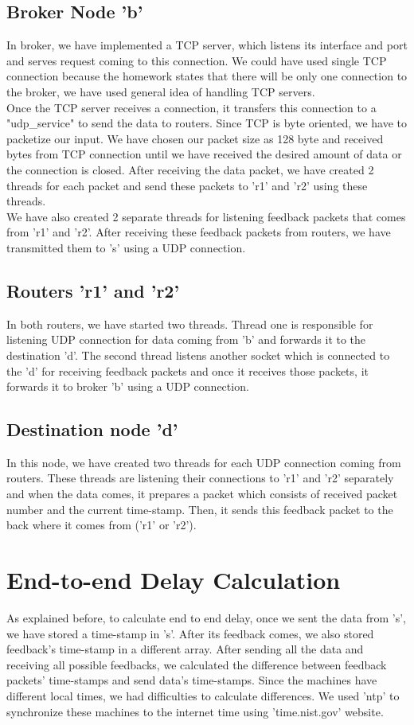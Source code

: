 \documentclass[12pt,journal,compsoc]{IEEEtran}
\begin{document}
\subsection{Broker Node 'b'}
In broker, we have implemented a TCP server, which listens its interface and port and serves request coming to this connection. We  could have used single TCP connection because the homework states that there will be only one connection to the broker, we have used general idea of handling TCP servers.\\
Once the TCP server receives a connection, it transfers this connection to a "udp\_service" to send the data to routers. Since TCP is byte oriented, we have to packetize our input. We have chosen our packet size as 128 byte and received bytes from TCP connection until we have received the desired amount of data or the connection is closed. After receiving the data packet, we have created 2 threads for each packet and send these packets to 'r1' and 'r2' using these threads.\\
We have also created 2 separate threads for listening feedback packets that comes from 'r1' and 'r2'. After receiving these feedback packets from routers, we have transmitted them to 's' using a UDP connection.

\subsection{Routers 'r1' and 'r2'}

In both routers, we have started two threads. Thread one is responsible for listening UDP connection for data coming from 'b' and forwards it to the destination 'd'. The second thread listens another socket which is connected to the 'd' for receiving feedback packets and once it receives those packets, it forwards it to broker 'b' using a UDP connection.

\subsection{Destination node 'd'}
In this node, we have created two threads for each UDP connection coming from routers. These threads are listening their connections to 'r1' and 'r2' separately and when the data comes, it prepares a packet which consists of received packet number and the current time-stamp. Then, it sends this feedback packet to the back where it comes from ('r1' or 'r2').

\section{End-to-end Delay Calculation}
As explained before, to calculate end to end delay, once we sent the data from 's', we have stored a time-stamp in 's'. After its feedback comes, we also stored feedback's time-stamp in a different array. After sending all the data and receiving all possible feedbacks, we calculated the difference between feedback packets' time-stamps and send data's time-stamps. Since the machines have different local times, we had difficulties to calculate differences. We used 'ntp' to synchronize these machines to the internet time using 'time.nist.gov' website.
\end{document}
